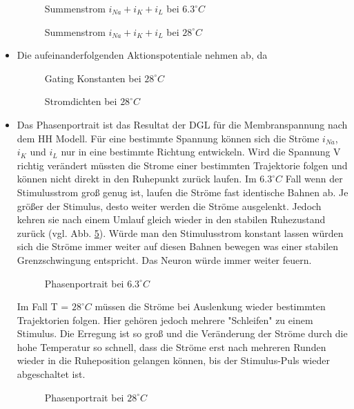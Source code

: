 \documentclass[conference]{IEEEtran}
\begin{document}
\begin{itemize}
\begin{figure}[h!]
  	\centering
    \scalebox{.6}{}
    \caption{Summenstrom $i_{Na}+i_K+i_L$ bei $6.3^\circ C$}
    \label{fig:Summenstrom6}
\end{figure}
\begin{figure}[h!]
  	\centering
    \scalebox{.6}{}
    \caption{Summenstrom $i_{Na}+i_K+i_L$ bei $28^\circ C$}
    \label{fig:Summenstrom28}
\end{figure}



\item Die aufeinanderfolgenden Aktionspotentiale nehmen ab, da
\begin{figure}[h!]
  	\centering
    \scalebox{.6}{}
    \caption{Gating Konstanten bei $28^\circ C$}
    \label{fig:GatingClose28}
\end{figure}
\begin{figure}[h!]
  	\centering
    \scalebox{.6}{}
    \caption{Stromdichten bei $28^\circ C$}
    \label{fig:StromdichtenClose28}
\end{figure}



\item Das Phasenportrait ist das Resultat der DGL für die Membranspannung nach dem HH Modell. Für eine bestimmte Spannung können sich die Ströme $i_{Na}$, $i_K$ und $i_L$ nur in eine bestimmte Richtung entwickeln. Wird die Spannung V richtig verändert müssten die Strome einer bestimmten Trajektorie folgen und können nicht direkt in den Ruhepunkt zurück laufen. Im $6.3^\circ C$ Fall wenn der Stimulusstrom groß genug ist, laufen die Ströme fast identische Bahnen ab. Je größer der Stimulus, desto weiter werden die Ströme ausgelenkt. Jedoch kehren sie nach einem Umlauf gleich wieder in den stabilen Ruhezustand zurück (vgl. Abb. \ref{fig:Phasenportrait6}). Würde man den Stimulusstrom konstant lassen würden sich die Ströme immer weiter auf diesen Bahnen bewegen was einer stabilen Grenzschwingung entspricht. Das Neuron würde immer weiter feuern.
\begin{figure}[h!]
  	\centering
    \scalebox{.6}{}
    \caption{Phasenportrait bei $6.3^\circ C$}
    \label{fig:Phasenportrait6}
\end{figure}
Im Fall T = $28^\circ C$ müssen die Ströme bei Auslenkung wieder bestimmten Trajektorien folgen. Hier gehören jedoch mehrere "Schleifen" zu einem Stimulus. Die Erregung ist so groß und die Veränderung der Ströme durch die hohe Temperatur so schnell, dass die Ströme erst nach mehreren Runden wieder in die Ruheposition gelangen können, bis der Stimulus-Puls wieder abgeschaltet ist. 
\begin{figure}[h!]
  	\centering
    \scalebox{.6}{}
    \caption{Phasenportrait bei $28^\circ C$}
    \label{fig:Phasenportrait28}
\end{figure}




\end{itemize}
\end{document}
